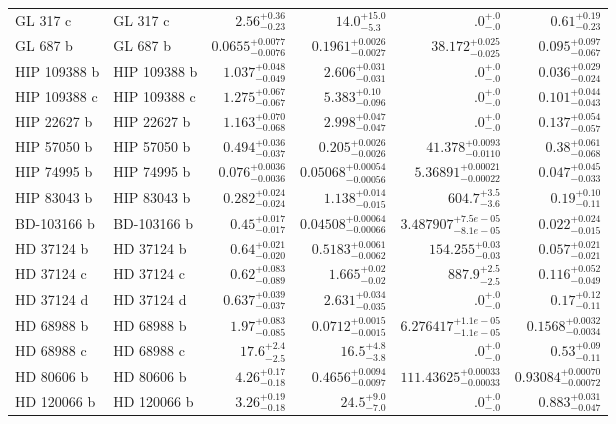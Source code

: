 \begin{longtable*}{llrrrr}
GL 317 c & GL 317 c & $2.56^{+0.36}_{-0.23}$ & $14.0^{+15.0}_{-5.3}$ & $.0^{+.0}_{-.0}$ & $0.61^{+0.19}_{-0.23}$ \\ 
GL 687 b & GL 687 b & $0.0655^{+0.0077}_{-0.0076}$ & $0.1961^{+0.0026}_{-0.0027}$ & $38.172^{+0.025}_{-0.025}$ & $0.095^{+0.097}_{-0.067}$ \\ 
HIP 109388 b & HIP 109388 b & $1.037^{+0.048}_{-0.049}$ & $2.606^{+0.031}_{-0.031}$ & $.0^{+.0}_{-.0}$ & $0.036^{+0.029}_{-0.024}$ \\ 
HIP 109388 c & HIP 109388 c & $1.275^{+0.067}_{-0.067}$ & $5.383^{+0.10}_{-0.096}$ & $.0^{+.0}_{-.0}$ & $0.101^{+0.044}_{-0.043}$ \\ 
HIP 22627 b & HIP 22627 b & $1.163^{+0.070}_{-0.068}$ & $2.998^{+0.047}_{-0.047}$ & $.0^{+.0}_{-.0}$ & $0.137^{+0.054}_{-0.057}$ \\ 
HIP 57050 b & HIP 57050 b & $0.494^{+0.036}_{-0.037}$ & $0.205^{+0.0026}_{-0.0026}$ & $41.378^{+0.0093}_{-0.0110}$ & $0.38^{+0.061}_{-0.068}$ \\ 
HIP 74995 b & HIP 74995 b & $0.076^{+0.0036}_{-0.0036}$ & $0.05068^{+0.00054}_{-0.00056}$ & $5.36891^{+0.00021}_{-0.00022}$ & $0.047^{+0.045}_{-0.033}$ \\ 
HIP 83043 b & HIP 83043 b & $0.282^{+0.024}_{-0.024}$ & $1.138^{+0.014}_{-0.015}$ & $604.7^{+3.5}_{-3.6}$ & $0.19^{+0.10}_{-0.11}$ \\ 
BD-103166 b & BD-103166 b & $0.45^{+0.017}_{-0.017}$ & $0.04508^{+0.00064}_{-0.00066}$ & $3.487907^{+7.5e-05}_{-8.1e-05}$ & $0.022^{+0.024}_{-0.015}$ \\ 
HD 37124 b & HD 37124 b & $0.64^{+0.021}_{-0.020}$ & $0.5183^{+0.0061}_{-0.0062}$ & $154.255^{+0.03}_{-0.03}$ & $0.057^{+0.021}_{-0.021}$ \\ 
HD 37124 c & HD 37124 c & $0.62^{+0.083}_{-0.089}$ & $1.665^{+0.02}_{-0.02}$ & $887.9^{+2.5}_{-2.5}$ & $0.116^{+0.052}_{-0.049}$ \\ 
HD 37124 d & HD 37124 d & $0.637^{+0.039}_{-0.037}$ & $2.631^{+0.034}_{-0.035}$ & $.0^{+.0}_{-.0}$ & $0.17^{+0.12}_{-0.11}$ \\ 
HD 68988 b & HD 68988 b & $1.97^{+0.083}_{-0.085}$ & $0.0712^{+0.0015}_{-0.0015}$ & $6.276417^{+1.1e-05}_{-1.1e-05}$ & $0.1568^{+0.0032}_{-0.0034}$ \\ 
HD 68988 c & HD 68988 c & $17.6^{+2.4}_{-2.5}$ & $16.5^{+4.8}_{-3.8}$ & $.0^{+.0}_{-.0}$ & $0.53^{+0.09}_{-0.11}$ \\ 
HD 80606 b & HD 80606 b & $4.26^{+0.17}_{-0.18}$ & $0.4656^{+0.0094}_{-0.0097}$ & $111.43625^{+0.00033}_{-0.00033}$ & $0.93084^{+0.00070}_{-0.00072}$ \\ 
HD 120066 b & HD 120066 b & $3.26^{+0.19}_{-0.18}$ & $24.5^{+9.0}_{-7.0}$ & $.0^{+.0}_{-.0}$ & $0.883^{+0.031}_{-0.047}$ \\ 
\bottomrule 
\end{longtable*} 
